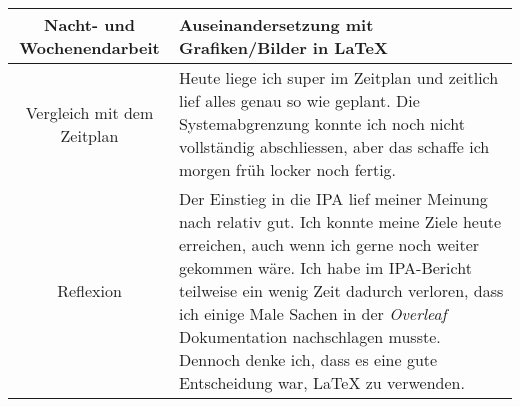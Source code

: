 \begin{tabularx}{\textwidth}[H]{|c|X|}
  Nacht- und Wochenendarbeit &
  Auseinandersetzung mit Grafiken/Bilder in LaTeX
  \\ \hline

  Vergleich mit dem Zeitplan &
  Heute liege ich super im Zeitplan und zeitlich lief alles genau so wie geplant. 
  Die Systemabgrenzung konnte ich noch nicht vollständig abschliessen, aber das schaffe ich morgen früh locker noch fertig.
  \\ \hline

  Reflexion &
  Der Einstieg in die IPA lief meiner Meinung nach relativ gut. Ich konnte meine Ziele heute erreichen, auch wenn ich gerne
  noch weiter gekommen wäre. Ich habe im IPA-Bericht teilweise ein wenig Zeit dadurch verloren, dass 
  ich einige Male Sachen in der \emph{Overleaf} Dokumentation nachschlagen musste. Dennoch denke ich, dass es eine
  gute Entscheidung war, LaTeX zu verwenden.
  \\ \hline
\end{tabularx}
